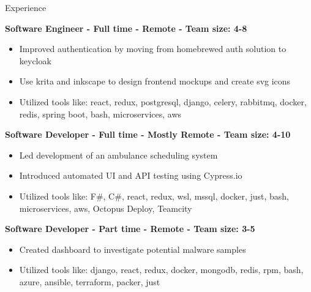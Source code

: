 \documentclass{resume} %
\begin{document}
\begin{rSection}{Experience}

\textbf{Software Engineer - Full time - Remote - Team size: 4-8} \\

\begin{itemize}
  \itemsep -2pt {}
      \item Improved authentication by moving from homebrewed auth solution to keycloak
    \item Use krita and inkscape to design frontend mockups and create svg icons
    \item Utilized tools like: react, redux, postgresql, django, celery, rabbitmq, docker, redis, spring boot, bash, microservices, aws
\end{itemize}

\textbf{Software Developer - Full time - Mostly Remote - Team size: 4-10} \\

\begin{itemize}
  \itemsep -2pt {}
      \item Led development of an ambulance scheduling system
    \item Introduced automated UI and API testing using Cypress.io
    \item Utilized tools like: F\#, C\#, react, redux, wsl, mssql, docker, just, bash, microservices, aws, Octopus Deploy, Teamcity
\end{itemize}

\textbf{Software Developer - Part time - Remote - Team size: 3-5} \\

\begin{itemize}
  \itemsep -2pt {}
      \item Created dashboard to investigate potential malware samples
    \item Utilized tools like: django, react, redux, docker, mongodb, redis, rpm, bash, azure, ansible, terraform, packer, just
\end{itemize}


\end{rSection}
\end{document}
